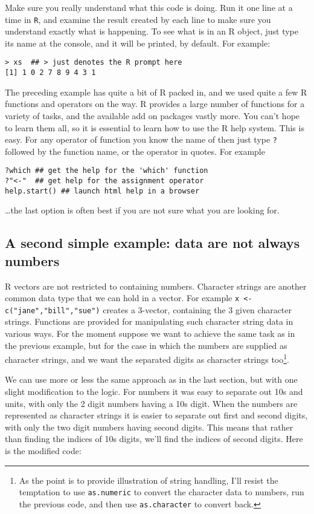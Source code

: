\documentclass[10pt] {article}
\theoremstyle{definition}
\begin{document}
Make sure you really understand what this code is doing. Run it one line at a time in {\tt R}, and examine the result created by each line to make sure you understand exactly what is happening. To see what is in an R object, just type its name at the console, and it will be printed, by default. For example:
\begin{lstlisting}
> xs  ## > just denotes the R prompt here
[1] 1 0 2 7 8 9 4 3 1
\end{lstlisting}

The preceding example has quite a bit of R packed in, and we used quite a few R functions and operators on the way. R provides a large number of functions for a variety of tasks, and the available add on packages vastly more. You can't hope to learn them all, so it is essential to learn how to use the R help system. This is easy. For any operator of function you know the name of then just type \lstinline+?+ followed by the function name, or the operator in quotes. For example
\begin{lstlisting}
?which ## get the help for the 'which' function
?"<-"  ## get help for the assignment operator
help.start() ## launch html help in a browser
\end{lstlisting}  
\ldots the last option is often best if you are not sure what you are looking for. 

\subsection{A second simple example: data are not always numbers}

R vectors are not restricted to containing numbers. Character strings are another common data type that we can hold in a vector. For example \lstinline+x <- c("jane","bill","sue")+ creates a 3-vector, containing the 3 given character strings. Functions are provided for manipulating such character string data in various ways. For the moment suppose we want to achieve the same task as in the previous example, but for the case in which the numbers are supplied as character strings, and we want the separated digits as character strings too\footnote{As the point is to provide illustration of string handling, I'll resist the temptation to use {\tt as.numeric} to convert the character data to numbers, run the previous code, and then use {\tt as.character} to convert back.}.  

We can use more or less the same approach as in the last section, but with one slight modification to the logic. For numbers it was easy to separate out 10s and units, with only the 2 digit numbers having a 10s digit. When the numbers are represented as character strings it is easier to separate out first and second digits, with only the two digit numbers having second digits. This means that rather than finding the indices of 10s digits, we'll find the indices of second digits. Here is the modified code: 
\end{document}
